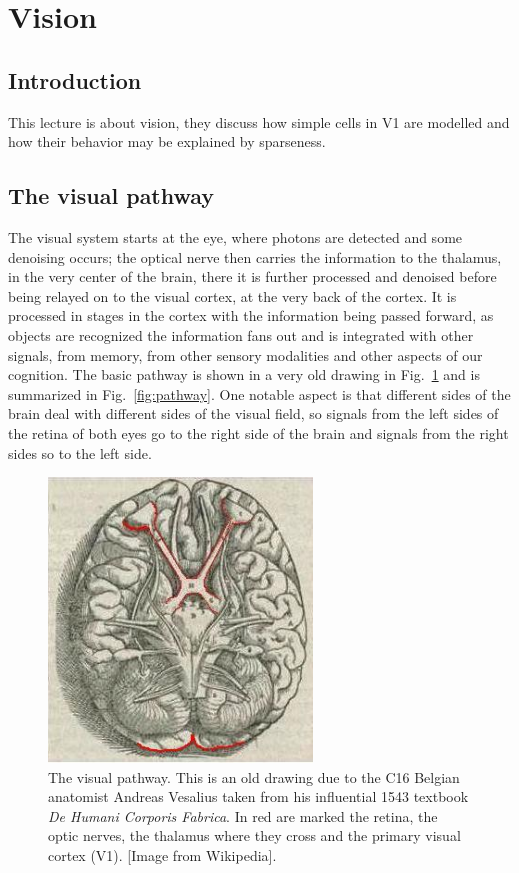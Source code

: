 \documentclass[11pt,a4paper]{scrartcl}
\begin{document}
\section*{Vision}

\subsection*{Introduction} 
This lecture is about vision, they discuss how simple cells in V1 are
modelled and how their behavior may be explained by sparseness.

\subsection*{The visual pathway}
The visual system starts at the eye, where photons are detected and
some denoising occurs; the optical nerve then carries the information
to the thalamus, in the very center of the brain, there it is further
processed and denoised before being relayed on to the visual cortex,
at the very back of the cortex. It is processed in stages in the
cortex with the information being passed forward, as objects are
recognized the information fans out and is integrated with other
signals, from memory, from other sensory modalities and other aspects
of our cognition. The basic pathway is shown in a very old drawing in
Fig.~\ref{fig:Fabrica} and is summarized in
Fig.~\ref{fig:pathway}. One notable aspect is that different sides of
the brain deal with different sides of the visual field, so signals
from the left sides of the retina of both eyes go to the right side of
the brain and signals from the right sides so to the left side.

\begin{figure}
\begin{center}
\includegraphics[width=7cm]{Fabrica_VisualSystem.jpg}
\end{center}
\caption{The visual pathway. This is an old drawing due to the C16
  Belgian anatomist Andreas Vesalius taken from his influential 1543
  textbook \textsl{De Humani Corporis Fabrica}. In red are marked the
  retina, the optic nerves, the thalamus where they cross and the
  primary visual cortex (V1). [Image from Wikipedia].\label{fig:Fabrica}}
\end{figure}
\end{document}
